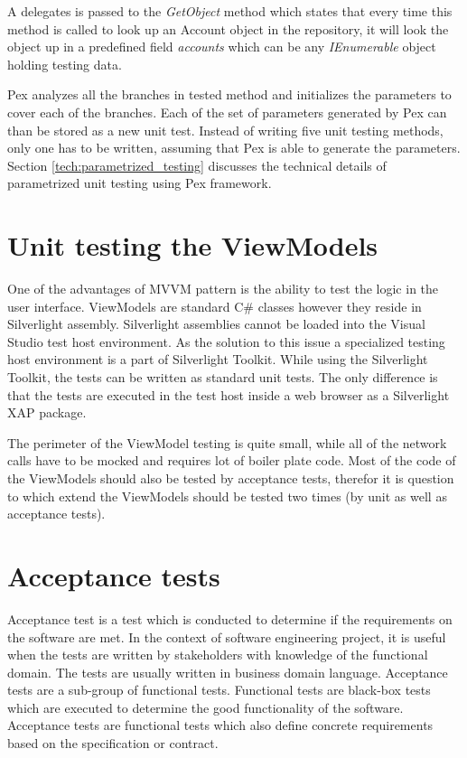 A delegates is passed to the \textit{GetObject} method which states that every time this method is called to look up an Account object in the repository, it will look the object up in a predefined field \textit{accounts} which can be any \textit{IEnumerable} object holding testing data.

Pex analyzes all the branches in tested method and initializes the parameters to cover each of the branches. Each of the set of parameters generated by Pex can than be stored as a new unit test. Instead of writing five unit testing methods, only one has to be written, assuming that Pex is able to generate the parameters. Section \ref{tech:parametrized_testing} discusses the technical details of parametrized unit testing using Pex framework.

\section{Unit testing the ViewModels}
One of the advantages of MVVM pattern is the ability to test the logic in the user interface. ViewModels are standard C\# classes however they reside in Silverlight assembly. Silverlight assemblies cannot be loaded into the Visual Studio test host environment. As the solution to this issue a specialized testing host environment is a part of Silverlight Toolkit. While using the Silverlight Toolkit, the tests can be written as standard unit tests. The only difference is that the tests are executed in the test host inside a web browser as a Silverlight XAP package.

The perimeter of the ViewModel testing is quite small, while all of the network calls have to be mocked and requires lot of boiler plate code. Most of the code of the ViewModels should also be tested by acceptance tests, therefor it is question to which extend the ViewModels should be tested two times (by unit as well as acceptance tests).

\section{Acceptance tests}
Acceptance test is a test which is conducted to determine if the requirements on the software are met\cite{wiki:acceptance}. In the context of software engineering project, it is useful when the tests are written by stakeholders with knowledge of the functional domain. The tests are usually written in business domain language. Acceptance tests are a sub-group of functional tests. Functional tests are black-box tests which are executed to determine the good functionality of the software. Acceptance tests are functional tests which also define concrete requirements based on the specification or contract.

